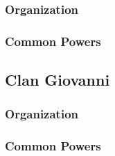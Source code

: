 \subsubsection{Organization}

\subsubsection{Common Powers}


\subsection{Clan Giovanni}
\label{sec:giovanni}

\subsubsection{Organization}

\subsubsection{Common Powers}
